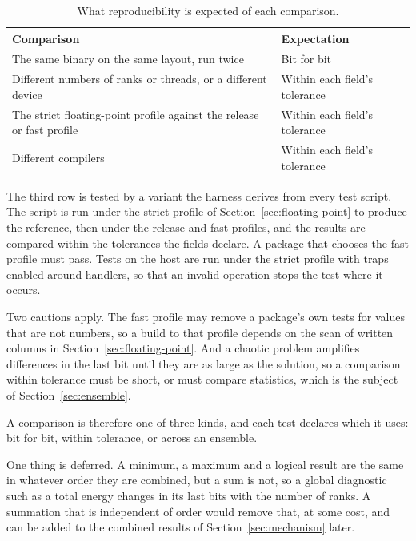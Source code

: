 \documentclass[11pt,a4paper]{article}
\begin{document}
\begin{table}[ht]
\centering
\small
\begin{tabularx}{\textwidth}{@{}L >{\raggedright\arraybackslash}p{52mm}@{}}
\toprule
Comparison & Expectation \\
\midrule
The same binary on the same layout, run twice & Bit for bit \\
Different numbers of ranks or threads, or a different device & Within each field's tolerance \\
The strict floating-point profile against the release or fast profile & Within each field's tolerance \\
Different compilers & Within each field's tolerance \\
\bottomrule
\end{tabularx}
\caption{What reproducibility is expected of each comparison.}
\label{tab:reproducibility}
\end{table}

The third row is tested by a variant the harness derives from every test
script.  The script is run under the strict profile of
Section~\ref{sec:floating-point} to produce the reference, then under the
release and fast profiles, and the results are compared within the
tolerances the fields declare.  A package that chooses the fast profile
must pass.  Tests on the host are run under the strict profile with traps
enabled around handlers, so that an invalid operation stops the test where
it occurs.

Two cautions apply.  The fast profile may remove a package's own tests for
values that are not numbers, so a build to that profile depends on the scan
of written columns in Section~\ref{sec:floating-point}.  And a chaotic
problem amplifies differences in the last bit until they are as large as
the solution, so a comparison within tolerance must be short, or must
compare statistics, which is the subject of Section~\ref{sec:ensemble}.

A comparison is therefore one of three kinds, and each test declares which
it uses: bit for bit, within tolerance, or across an ensemble.

One thing is deferred.  A minimum, a maximum and a logical result are the
same in whatever order they are combined, but a sum is not, so a global
diagnostic such as a total energy changes in its last bits with the number
of ranks.  A summation that is independent of order would remove that, at
some cost, and can be added to the combined results of
Section~\ref{sec:mechanism} later.
\end{document}
